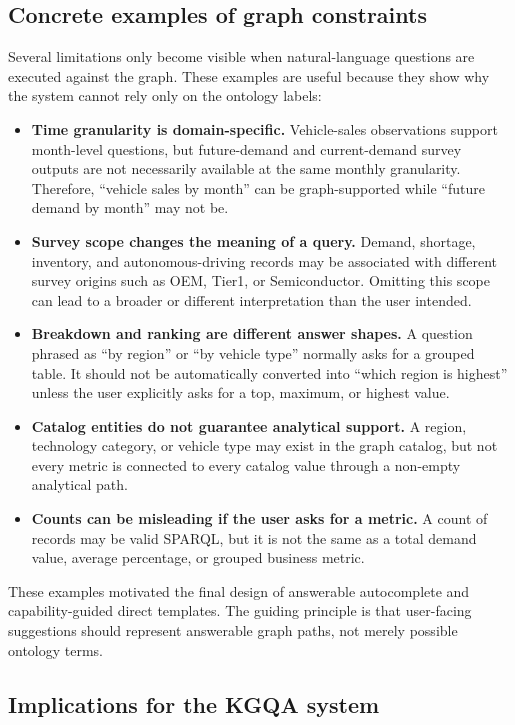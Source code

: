 \subsection{Concrete examples of graph constraints}
\label{subsec:concrete-graph-constraints}

Several limitations only become visible when natural-language questions are executed against the graph. These examples are useful because they show why the system cannot rely only on the ontology labels:

\begin{itemize}
    \item \textbf{Time granularity is domain-specific.} Vehicle-sales observations support month-level questions, but future-demand and current-demand survey outputs are not necessarily available at the same monthly granularity. Therefore, ``vehicle sales by month'' can be graph-supported while ``future demand by month'' may not be.
    \item \textbf{Survey scope changes the meaning of a query.} Demand, shortage, inventory, and autonomous-driving records may be associated with different survey origins such as OEM, Tier1, or Semiconductor. Omitting this scope can lead to a broader or different interpretation than the user intended.
    \item \textbf{Breakdown and ranking are different answer shapes.} A question phrased as ``by region'' or ``by vehicle type'' normally asks for a grouped table. It should not be automatically converted into ``which region is highest'' unless the user explicitly asks for a top, maximum, or highest value.
    \item \textbf{Catalog entities do not guarantee analytical support.} A region, technology category, or vehicle type may exist in the graph catalog, but not every metric is connected to every catalog value through a non-empty analytical path.
    \item \textbf{Counts can be misleading if the user asks for a metric.} A count of records may be valid SPARQL, but it is not the same as a total demand value, average percentage, or grouped business metric.
\end{itemize}

These examples motivated the final design of answerable autocomplete and capability-guided direct templates. The guiding principle is that user-facing suggestions should represent answerable graph paths, not merely possible ontology terms.

\subsection{Implications for the KGQA system}

